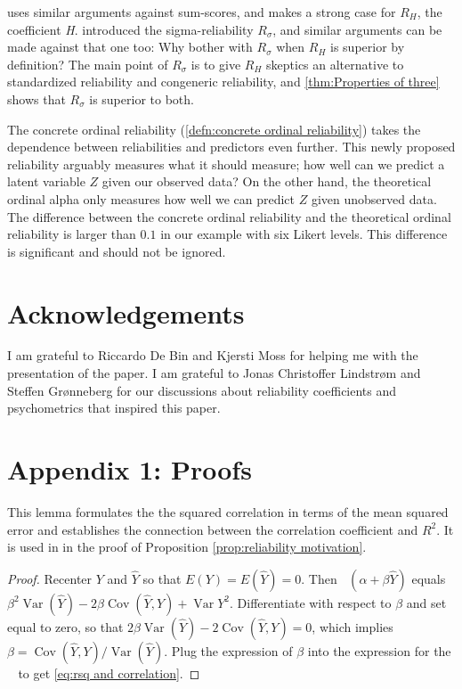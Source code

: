 \documentclass[twoside]{article}
\DeclareMathOperator{\Var}{Var}
\DeclareMathOperator{\Cov}{Cov}
\DeclareMathOperator{\MSE}{MSE_Z}
\begin{document}
\citet{McNeish2019-ea} uses similar arguments against sum-scores, and makes a strong case for $ R_H$, the coefficient \textit{H}.  introduced the sigma-reliability $ R_\sigma$, and similar arguments can be made against that one too: Why bother with $ R_\sigma$ when $ R_H$ is superior by definition? The main point of $ R_\sigma$ is to give $ R_H$ skeptics an alternative to standardized reliability and congeneric reliability, and \cref{thm:Properties of three} shows that $ R_\sigma$ is superior to both. 

The concrete ordinal reliability (\cref{defn:concrete ordinal reliability}) takes the dependence between reliabilities and predictors even further. This newly proposed reliability arguably measures what it should measure; how well can we predict a latent variable $Z$ given our observed data? On the other hand, the theoretical ordinal alpha only measures how well we can predict $Z$ given unobserved data. The difference between the concrete ordinal reliability and the theoretical ordinal reliability is larger than $0.1$ in our example with six Likert levels. This difference is significant and should not be ignored.

\section{Acknowledgements}
I am grateful to Riccardo De Bin and Kjersti Moss for helping me with the presentation of the paper. I am grateful to Jonas Christoffer Lindstrøm and Steffen Grønneberg for our discussions about reliability coefficients and psychometrics that inspired this paper.

\clearpage
\section*{Appendix 1: Proofs}
\label{Appendix 1}

This lemma formulates the the squared correlation in terms of the mean squared error and establishes the connection between the correlation coefficient and $R^2$. It is used in in the proof of Proposition \ref{prop:reliability motivation}. 


\begin{proof}
Recenter $Y$ and $\hat{Y}$ so that $E(Y)=E(\hat{Y})=0$. Then $\MSE(\alpha+\beta\hat{Y})$ equals $\beta^{2}\Var(\hat{Y})-2\beta\Cov(\hat{Y},Y)+\Var Y^{2}$.
Differentiate with respect to $\beta$ and set equal to zero, so that
$2\beta\Var(\hat{Y})-2\Cov(\hat{Y},Y)=0$, which implies $\beta=\Cov(\hat{Y},Y)/\Var(\hat{Y})$. Plug the expression of $\beta$ into the expression for the $\MSE$ to get \cref{eq:rsq and correlation}.
\end{proof}
\end{document}
